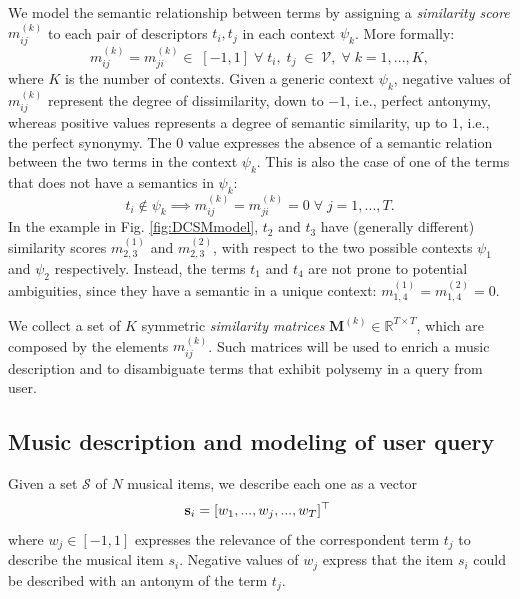 We model the semantic relationship between terms by assigning a \textit{similarity score} $m_{ij}^{(k)}$ to each pair of descriptors $t_i, t_j$ in each context $\psi_k$. More formally: 
\begin{equation}
m_{ij}^{(k)} = m_{ji}^{(k)} \in \; [-1, 1] \; \forall \; t_i, \; t_j \; \in \; \mathcal{V}, \;  \forall \;  k  = 1, ..., K, 
\end{equation}
where $K$ is the number of contexts. 
Given a generic context $\psi_k$, negative values of $m_{ij}^{(k)}$ represent the degree of dissimilarity, down to $-1$, i.e., perfect antonymy, whereas positive values represents a degree of semantic similarity, up to $1$, i.e., the perfect synonymy.
The $0$ value expresses the absence of a semantic relation between the two terms in the context $\psi_k$. This is also the case of one of the terms that does not have a semantics in $\psi_k$:
\begin{equation}
t_i \notin \psi_k \implies m_{ij}^{(k)}=m_{ji}^{(k)}=0  \;\forall \; j =1,..., T.
\end{equation} 
In the example in Fig. \ref{fig:DCSMmodel}, $t_2$ and $t_3$ have (generally different) similarity scores $m^{(1)}_{2,3}$ and $ m^{(2)}_{2,3}$, with respect to the two possible contexts $\psi_1$ and $\psi_2$ respectively. 
Instead, the terms $t_1$ and $t_4$ are not prone to potential ambiguities, since they have a semantic in a unique context: $m^{(1)}_{1,4}=m^{(2)}_{1,4}=0$.

We collect a set of $K$ symmetric \textit{similarity matrices} $\mathbf{M}^{(k)} \in \mathbb{R}^{T \times T}$, which are composed by the elements $m^{(k)}_{ij}$. Such matrices will be used to enrich a music description and to disambiguate terms that exhibit polysemy in a query from user. 

\subsection{Music description and modeling of user query}
\label{subsec:DCSMquery}
Given a set $\mathcal{S}$ of $N$ musical items, we describe each one as a vector 
\begin{equation}
\mathbf{s}_i = \lbrack w_1,...,w_j,...,w_{T} \rbrack ^\top \;
\end{equation}
where $w_j \in [-1,1]$ expresses the relevance of the correspondent term $t_j$ to describe the musical item $s_i$. Negative values of $w_j$ express that the item $s_i$ could be described with an antonym of the term $t_j$.

